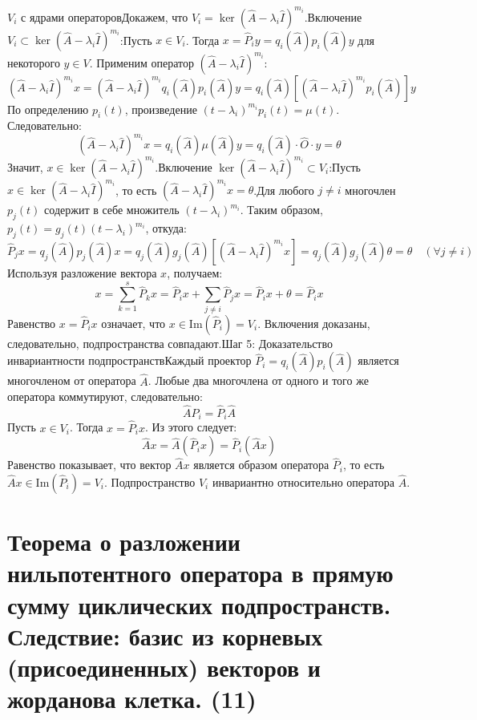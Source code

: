 \documentclass[14pt]{extreport}
\begin{document}
\begin{prbox}
$V_i$ с ядрами операторовДокажем, что $V_i = \ker(\hat{A} - \lambda_i \hat{I})^{m_i}$.Включение $V_i \subset \ker(\hat{A} - \lambda_i \hat{I})^{m_i}$:Пусть $x \in V_i$. Тогда $x = \hat{P}_i y = q_i(\hat{A})p_i(\hat{A})y$ для некоторого $y \in V$. Применим оператор $(\hat{A} - \lambda_i \hat{I})^{m_i}$:$$(\hat{A} - \lambda_i \hat{I})^{m_i} x = (\hat{A} - \lambda_i \hat{I})^{m_i} q_i(\hat{A})p_i(\hat{A})y = q_i(\hat{A}) \left[ (\hat{A} - \lambda_i \hat{I})^{m_i} p_i(\hat{A}) \right] y$$По определению $p_i(t)$, произведение $(t - \lambda_i)^{m_i} p_i(t) = \mu(t)$. Следовательно:$$(\hat{A} - \lambda_i \hat{I})^{m_i} x = q_i(\hat{A}) \mu(\hat{A}) y = q_i(\hat{A}) \cdot \hat{O} \cdot y = \theta$$Значит, $x \in \ker(\hat{A} - \lambda_i \hat{I})^{m_i}$.Включение $\ker(\hat{A} - \lambda_i \hat{I})^{m_i} \subset V_i$:Пусть $x \in \ker(\hat{A} - \lambda_i \hat{I})^{m_i}$, то есть $(\hat{A} - \lambda_i \hat{I})^{m_i} x = \theta$.Для любого $j \neq i$ многочлен $p_j(t)$ содержит в себе множитель $(t - \lambda_i)^{m_i}$. Таким образом, $p_j(t) = g_j(t)(t - \lambda_i)^{m_i}$, откуда:$$\hat{P}_j x = q_j(\hat{A}) p_j(\hat{A}) x = q_j(\hat{A}) g_j(\hat{A}) \left[ (\hat{A} - \lambda_i \hat{I})^{m_i} x \right] = q_j(\hat{A}) g_j(\hat{A}) \theta = \theta \quad (\forall j \neq i)$$Используя разложение вектора $x$, получаем:$$x = \sum_{k=1}^s \hat{P}_k x = \hat{P}_i x + \sum_{j \neq i} \hat{P}_j x = \hat{P}_i x + \theta = \hat{P}_i x$$Равенство $x = \hat{P}_i x$ означает, что $x \in \text{Im}(\hat{P}_i) = V_i$. Включения доказаны, следовательно, подпространства совпадают.Шаг 5: Доказательство инвариантности подпространствКаждый проектор $\hat{P}_i = q_i(\hat{A})p_i(\hat{A})$ является многочленом от оператора $\hat{A}$. Любые два многочлена от одного и того же оператора коммутируют, следовательно:$$\hat{A} \hat{P}_i = \hat{P}_i \hat{A}$$Пусть $x \in V_i$. Тогда $x = \hat{P}_i x$. Из этого следует:$$\hat{A} x = \hat{A} (\hat{P}_i x) = \hat{P}_i (\hat{A} x)$$Равенство показывает, что вектор $\hat{A}x$ является образом оператора $\hat{P}_i$, то есть $\hat{A}x \in \text{Im}(\hat{P}_i) = V_i$. Подпространство $V_i$ инвариантно относительно оператора $\hat{A}$.
    \end{prbox}
	
    
    \chapter{Теорема о разложении нильпотентного оператора в прямую сумму циклических подпространств. Следствие: базис из корневых (присоединенных) векторов и жорданова клетка. (11)}
\end{document}
